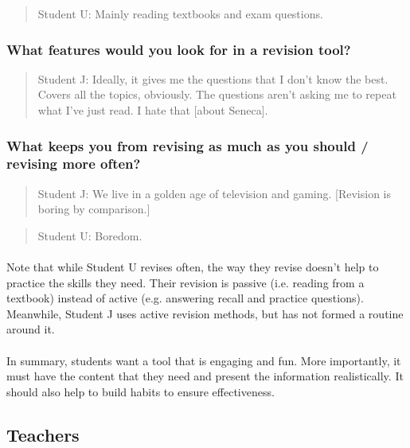 \documentclass{report}
\begin{document}
\begin{quote}{Student U:}
  Mainly reading textbooks and exam questions.
\end{quote}
\subsubsection{What features would you look for in a revision tool?}
\begin{quote}{Student J:}
  Ideally, it gives me the questions that I don't know the best. Covers all the topics, obviously. The questions aren't asking me to repeat what I've just read. I hate that [about Seneca].
\end{quote}

\subsubsection{What keeps you from revising as much as you should / revising more often?}
\begin{quote}{Student J:}
  We live in a golden age of television and gaming. [Revision is boring by comparison.]
\end{quote}

\begin{quote}{Student U:}
  Boredom.
\end{quote}
\hrulefill

\paragraph{}
Note that while Student U revises often, the way they revise doesn't help to practice the skills they need. Their revision is passive (i.e. reading from a textbook) instead of active (e.g. answering recall and practice questions). Meanwhile, Student J uses active revision methods, but has not formed a routine around it.

\paragraph{}
In summary, students want a tool that is engaging and fun. More importantly, it must have the content that they need and present the information realistically. It should also help to build habits to ensure effectiveness.

\subsection{Teachers}
\end{document}
